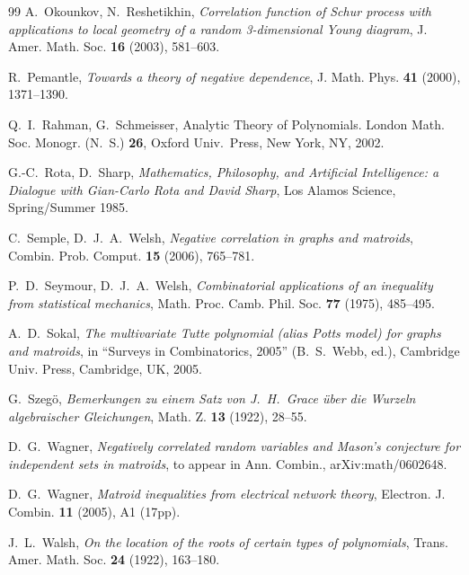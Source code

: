 \documentclass[10pt,reqno]{amsart}
\theoremstyle{plain}
\theoremstyle{definition}
\theoremstyle{remark}
\begin{document}
\begin{thebibliography}{99}
A.~Okounkov, N.~Reshetikhin, {\em Correlation function of Schur process with
applications to local geometry of a random 3-dimensional Young diagram},
J. Amer. Math. Soc. {\bf 16} (2003), 581--603.

R.~Pemantle, {\em Towards a theory of negative dependence}, J. Math. Phys. 
{\bf 41} (2000), 1371--1390.

Q.~I.~Rahman, G.~Schmeisser, Analytic Theory of Polynomials. London
Math. Soc. Monogr. (N.~S.) {\bf 26}, Oxford Univ.~Press, New York,
NY, 2002.

G.-C.~Rota, D.~Sharp, {\em Mathematics, Philosophy, and Artificial 
Intelligence: a Dialogue with Gian-Carlo Rota and David Sharp}, 
Los Alamos Science, Spring/Summer 1985.

C.~Semple, D.~J.~A.~Welsh, {\em Negative correlation in graphs and matroids}, Combin. Prob. Comput. {\bf 15} (2006), 765--781.

P.~D.~Seymour, D.~J.~A.~Welsh, {\em Combinatorial applications of an inequality from statistical mechanics}, Math. Proc. Camb. Phil. Soc. {\bf 77} (1975), 485--495.

A.~D.~Sokal, {\em The multivariate Tutte polynomial (alias Potts model)
for graphs and matroids}, in ``Surveys in Combinatorics, 2005'' 
(B.~S.~Webb, ed.), Cambridge Univ. Press, Cambridge, UK, 2005. 

G.~Szeg\"o, {\em Bemerkungen zu einem Satz von J.~H.~Grace \"uber die Wurzeln 
algebraischer Gleichungen}, Math. Z. {\bf 13} (1922), 28--55.

D.~G.~Wagner, {\em Negatively correlated random variables and Mason's 
conjecture for independent sets in matroids}, to appear in Ann. Combin., 
arXiv:math/0602648.

D.~G.~Wagner, {\em Matroid inequalities from electrical network theory},
Electron. J. Combin. {\bf 11} (2005), A1 (17pp).

J.~L.~Walsh, {\em On the location of the roots of certain types of 
polynomials}, Trans. Amer. Math. Soc. {\bf 24} (1922), 163--180.

\end{thebibliography}
\end{document}
